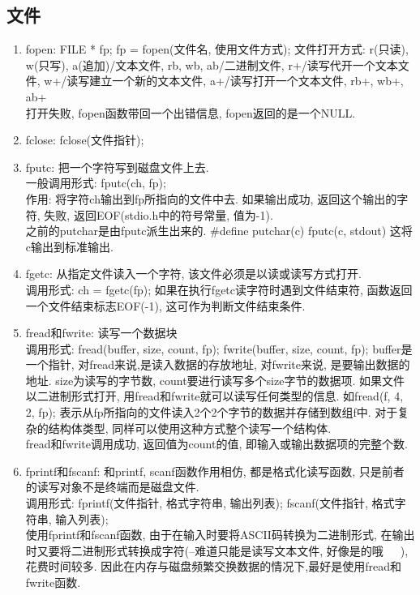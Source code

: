 \documentclass[a4paper,10pt,english]{article}
\begin{document}
\subsection {文件}
\begin {enumerate}
\item {fopen}:
FILE * fp; fp = fopen(文件名, 使用文件方式); 文件打开方式: r(只读), w(只写), a(追加)/文本文件, rb, wb, ab/二进制文件, r+/读写代开一个文本文件, w+/读写建立一个新的文本文件, a+/读写打开一个文本文件, rb+, wb+, ab+ \\
打开失败, fopen函数带回一个出错信息, fopen返回的是一个NULL.\\
\item {fclose}: fclose(文件指针); 
\item {fputc}: 把一个字符写到磁盘文件上去.\\
一般调用形式: fputc(ch, fp); \\
作用: 将字符ch输出到fp所指向的文件中去. 如果输出成功, 返回这个输出的字符, 失败, 返回EOF(stdio.h中的符号常量, 值为-1).\\
之前的putchar是由fputc派生出来的. \#define putchar(c) fputc(c, stdout)  这将c输出到标准输出. 
\item {fgetc}: 从指定文件读入一个字符, 该文件必须是以读或读写方式打开. \\
调用形式: ch = fgetc(fp); 如果在执行fgetc读字符时遇到文件结束符, 函数返回一个文件结束标志EOF(-1), 这可作为判断文件结束条件.

\item {fread和fwrite}: 读写一个数据块  \\
调用形式: fread(buffer, size, count, fp); fwrite(buffer, size, count, fp); buffer是一个指针, 对fread来说,是读入数据的存放地址, 对fwrite来说, 是要输出数据的地址. size为读写的字节数, count要进行读写多个size字节的数据项. 如果文件以二进制形式打开, 用fread和fwrite就可以读写任何类型的信息. 如fread(f, 4, 2, fp); 表示从fp所指向的文件读入2个2个字节的数据并存储到数组f中. 对于复杂的结构体类型, 同样可以使用这种方式整个读写一个结构体.\\
fread和fwrite调用成功, 返回值为count的值, 即输入或输出数据项的完整个数.
\item {fprintf和fscanf}: 和printf, scanf函数作用相仿, 都是格式化读写函数, 只是前者的读写对象不是终端而是磁盘文件. \\
调用形式: fprintf(文件指针, 格式字符串, 输出列表); fscanf(文件指针, 格式字符串, 输入列表); \\
使用fprintf和fscanf函数, 由于在输入时要将ASCII码转换为二进制形式, 在输出时又要将二进制形式转换成字符(--难道只能是读写文本文件, 好像是的哦~~~), 花费时间较多. 因此在内存与磁盘频繁交换数据的情况下,最好是使用fread和fwrite函数.


\end{enumerate}
\end{document}
